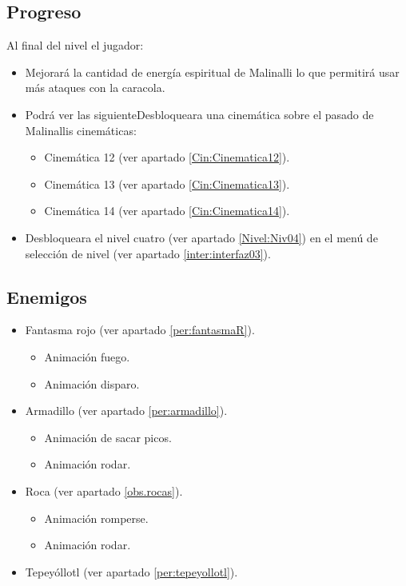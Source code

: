 	\subsection{Progreso}
Al final del nivel el jugador:
\begin{itemize}
	\item Mejorará la cantidad de energía espiritual de Malinalli lo que permitirá usar más ataques con la caracola.
	\item Podrá ver las siguienteDesbloqueara una cinemática sobre el pasado de Malinallis cinemáticas: 
		\begin{itemize}
			\item Cinemática 12 (ver apartado \ref{Cin:Cinematica12}).
			\item Cinemática 13 (ver apartado \ref{Cin:Cinematica13}).
			\item Cinemática 14 (ver apartado \ref{Cin:Cinematica14}).
		\end{itemize}
	\item Desbloqueara el nivel cuatro (ver apartado \ref{Nivel:Niv04}) en el menú de selección de nivel (ver apartado \ref{inter:interfaz03}).
\end{itemize} 
	\subsection{Enemigos}
\begin{itemize}
	\item 	Fantasma rojo (ver apartado \ref{per:fantasmaR}).
		\begin{itemize}
				\item Animación fuego.
				\item Animación disparo.
			\end{itemize}
	\item Armadillo (ver apartado \ref{per:armadillo}).
		\begin{itemize}
			\item Animación de sacar picos.
			\item Animación rodar. 
		\end{itemize}
	\item Roca (ver apartado \ref{obs.rocas}).
		\begin{itemize}
			\item Animación romperse.
			\item Animación rodar.
		\end{itemize}
	\item Tepeyóllotl (ver apartado \ref{per:tepeyollotl}). 

\end{itemize}
